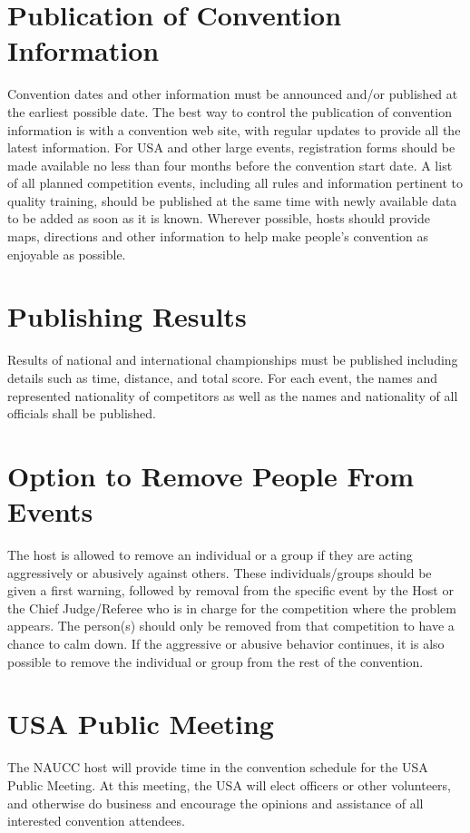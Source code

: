 \section{Publication of Convention Information}

Convention dates and other information must be announced and/or published at the earliest possible date.
The best way to control the publication of convention information is with a convention web site, with regular updates to provide all the latest information.
For USA and other large events, registration forms should be made available no less than four months before the convention start date.
A list of all planned competition events, including all rules and information pertinent to quality training, should be published at the same time with newly available data to be added as soon as it is known.
Wherever possible, hosts should provide maps, directions and other information to help make people's convention as enjoyable as possible.

\section{Publishing Results \label{sec:publishing_results}}
Results of national and international championships must be published including details such as time, distance, and total score.
For each event, the names and represented nationality of competitors as well as the names and nationality of all officials shall be published.

\section{Option to Remove People From Events}
The host is allowed to remove an individual or a group if they are acting aggressively or abusively against others.
These individuals/groups should be given a first warning, followed by removal from the specific event by the Host or the Chief Judge/Referee who is in charge for the competition where the problem appears.
The person(s) should only be removed from that competition to have a chance to calm down.
If the aggressive or abusive behavior continues, it is also possible to remove the individual or group from the rest of the convention.

\section{USA Public Meeting}

The NAUCC host will provide time in the convention schedule for the USA Public Meeting.
At this meeting, the USA will elect officers or other volunteers, and otherwise do business and encourage the opinions and assistance of all interested convention attendees.

